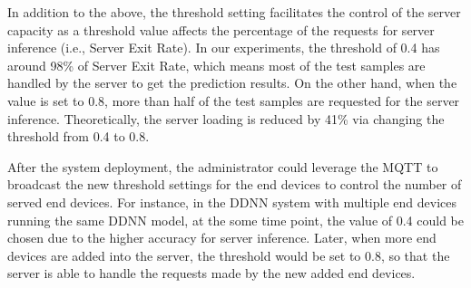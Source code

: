 \documentclass[conference]{IEEEtran}
\def\sectionname{Section}
\begin{document}

In addition to the above, the threshold setting facilitates the control of the server capacity as a threshold value affects the percentage of the requests for server inference (i.e., Server Exit Rate). In our experiments, the threshold of 0.4
has around 98\% of Server Exit Rate, which means most of the test samples are handled by the server to get the prediction results. On the other hand, when the value is set to 0.8, more than half of the test samples are requested for the server inference. Theoretically, the server loading is reduced by 41\% via changing the threshold from 0.4 to 0.8.

After the system deployment, the administrator could leverage the MQTT to broadcast the new threshold settings for the end devices to control the number of served end devices. For instance, in the DDNN system with multiple end devices running the same DDNN model, at the some time point, the value of 0.4 could be chosen due to the higher accuracy for server inference. Later, when more end devices are added into the server, the threshold would be set to 0.8, so that the server is able to handle the requests made by the new added end devices.
\end{document}

